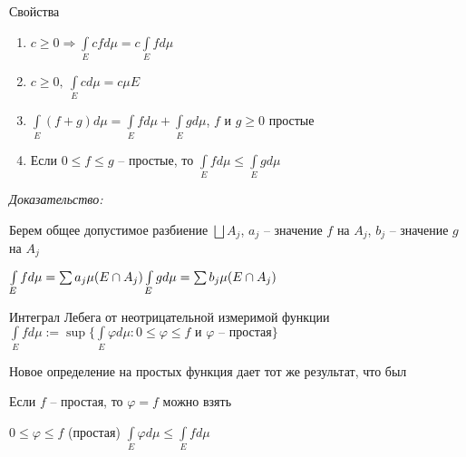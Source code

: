 \documentclass[12pt]{article}
\begin{document}
\begin{theo}{Свойства}
    \begin{enumerate}
        \item $c \geq 0 \Rightarrow \int\limits_E cfd\mu = c\int\limits_E fd\mu$
        \item $c \geq 0,\ \int\limits_E cd\mu = c\mu E$
        \item $\int\limits_E (f + g)d\mu = \int\limits_E fd\mu + \int\limits_E gd\mu$, $f$ и $g \geq 0$ простые 
        \item Если $0 \leq f \leq g$ -- простые, то $\int\limits_E fd\mu \leq \int\limits_E gd\mu$
    \end{enumerate}
\end{theo}

\textit{Доказательство:}

Берем общее допустимое разбиение $\bigsqcup A_j$, $a_j$ -- значение $f$ на $A_j$, $b_j$ -- значение $g$ на $A_j$

$\int\limits_E fd\mu = \sum a_j \mu(E \cap A_j) \\ \int\limits_E gd\mu = \sum b_j \mu(E \cap A_j)$

\begin{defin}{Интеграл Лебега от неотрицательной измеримой функции}
    $\int\limits_E fd\mu := \sup\{\int\limits_E \varphi d\mu : 0 \leq \varphi \leq f \text{ и } \varphi \text{ -- простая}\}$
\end{defin}

\begin{Remark}{}
    Новое определение на простых функция дает тот же результат, что был

    Если $f$ -- простая, то $\varphi = f$ можно взять 

    $0 \leq \varphi \leq f$ (простая) $\int\limits_E \varphi d\mu \leq \int\limits_E fd\mu$
\end{Remark}
\end{document}
